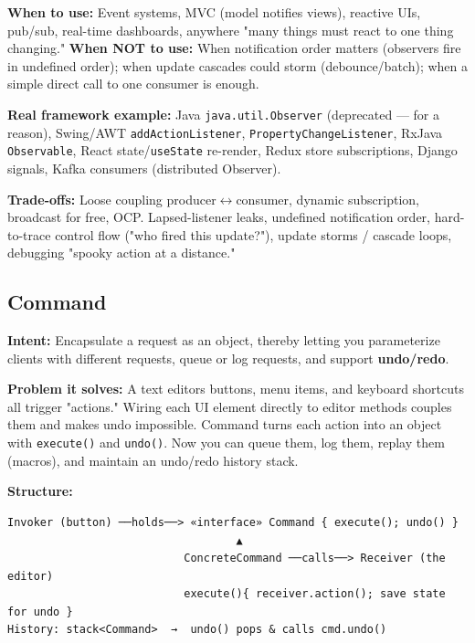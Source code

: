 \documentclass[11pt]{article}
\begin{document}
\textbf{When to use:} Event systems, MVC (model notifies views), reactive UIs, pub/sub, real-time dashboards, anywhere "many things must react to one thing changing." \textbf{When NOT to use:} When notification order matters (observers fire in undefined order); when update cascades could storm (debounce/batch); when a simple direct call to one consumer is enough.

\textbf{Real framework example:} Java \texttt{java.util.Observer} (deprecated --- for a reason), Swing/AWT \texttt{addActionListener}, \texttt{PropertyChangeListener}, RxJava \texttt{Observable}, React state/\texttt{useState} re-render, Redux store subscriptions, Django signals, Kafka consumers (distributed Observer).

\textbf{Trade-offs:} Loose coupling producer\(\leftrightarrow\)consumer, dynamic subscription, broadcast for free, OCP. Lapsed-listener leaks, undefined notification order, hard-to-trace control flow ("who fired this update?"), update storms / cascade loops, debugging "spooky action at a distance."

\subsection{Command}\label{command}

\textbf{Intent:} Encapsulate a request as an object, thereby letting you parameterize clients with different requests, queue or log requests, and support \textbf{undo/redo}.

\textbf{Problem it solves:} A text editor\textquotesingle s buttons, menu items, and keyboard shortcuts all trigger "actions." Wiring each UI element directly to editor methods couples them and makes undo impossible. Command turns each action into an object with \texttt{execute()} and \texttt{undo()}. Now you can queue them, log them, replay them (macros), and maintain an undo/redo history stack.

\textbf{Structure:}

\setcodelang{}

\begin{verbatim}
Invoker (button) ──holds──> «interface» Command { execute(); undo() }
                                   ▲
                           ConcreteCommand ──calls──> Receiver (the editor)
                           execute(){ receiver.action(); save state for undo }
History: stack<Command>  →  undo() pops & calls cmd.undo()
\end{verbatim}

\end{document}
